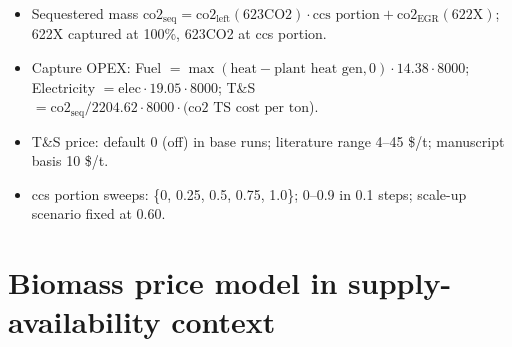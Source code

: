 \documentclass[11pt]{article}
\begin{document}
\begin{itemize}
  \item Sequestered mass $\text{co2}_\text{seq} = \text{co2}_\text{left}(\text{623CO2})\cdot\text{ccs portion} + \text{co2}_\text{EGR}(\text{622X})$;
    622X captured at 100\%, 623CO2 at ccs portion.
  \item Capture OPEX: Fuel $= \max(\text{heat} - \text{plant heat gen}, 0)\cdot 14.38\cdot 8000$;
    Electricity $= \text{elec}\cdot 19.05\cdot 8000$; T\&S $= \text{co2}_\text{seq}/2204.62\cdot 8000\cdot(\text{co2 TS cost per ton}$).
  \item \COtwo{} T\&S price: default 0 (off) in base runs; literature range 4--45 \$/t; manuscript basis
    10 \$/t. 
  \item ccs portion sweeps: \{0, 0.25, 0.5, 0.75, 1.0\}; 0--0.9 in 0.1 steps; scale-up scenario fixed at 0.60.
\end{itemize}






\section{Biomass price model in supply-availability context}\label{sec:S7}
\end{document}
